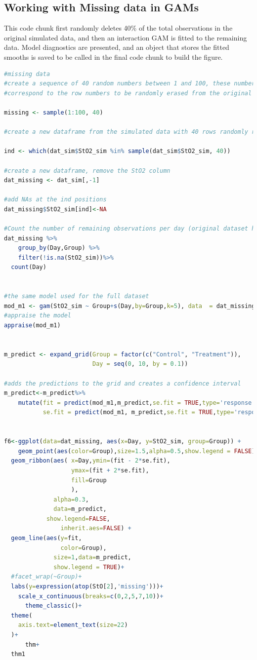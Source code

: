 \documentclass[
]{article}
\begin{document}
\hypertarget{working-with-missing-data-in-gams}{%
\subsection{Working with Missing data in GAMs}\label{working-with-missing-data-in-gams}}

This code chunk first randomly deletes 40\% of the total observations in the original simulated data, and then an interaction GAM is fitted to the remaining data. Model diagnostics are presented, and an object that stores the fitted smooths is saved to be called in the final code chunk to build the figure.

\begin{lstlisting}[language=R]
#missing data
#create a sequence of 40 random numbers between 1 and 100, these numbers will
#correspond to the row numbers to be randomly erased from the original dataset

missing <- sample(1:100, 40)

#create a new dataframe from the simulated data with 40 rows randomly removed, keep the missing values as NA

ind <- which(dat_sim$StO2_sim %in% sample(dat_sim$StO2_sim, 40))

#create a new dataframe, remove the StO2 column
dat_missing <- dat_sim[,-1]

#add NAs at the ind positions
dat_missing$StO2_sim[ind]<-NA 

#Count the number of remaining observations per day (original dataset had 10 per group per day)
dat_missing %>%
    group_by(Day,Group) %>%
    filter(!is.na(StO2_sim))%>%
  count(Day)


#the same model used for the full dataset
mod_m1 <- gam(StO2_sim ~ Group+s(Day,by=Group,k=5), data  = dat_missing,family=scat)
#appraise the model
appraise(mod_m1)


m_predict <- expand_grid(Group = factor(c("Control", "Treatment")),
                         Day = seq(0, 10, by = 0.1))

#adds the predictions to the grid and creates a confidence interval
m_predict<-m_predict%>%
    mutate(fit = predict(mod_m1,m_predict,se.fit = TRUE,type='response')$fit,
           se.fit = predict(mod_m1, m_predict,se.fit = TRUE,type='response')$se.fit)


f6<-ggplot(data=dat_missing, aes(x=Day, y=StO2_sim, group=Group)) +
    geom_point(aes(color=Group),size=1.5,alpha=0.5,show.legend = FALSE)+
  geom_ribbon(aes( x=Day,ymin=(fit - 2*se.fit), 
                   ymax=(fit + 2*se.fit),
                   fill=Group
                   ),
              alpha=0.3,
              data=m_predict,
            show.legend=FALSE,
                inherit.aes=FALSE) +
  geom_line(aes(y=fit,
                color=Group),
              size=1,data=m_predict,
              show.legend = TRUE)+
  #facet_wrap(~Group)+
  labs(y=expression(atop(StO[2],'missing')))+
    scale_x_continuous(breaks=c(0,2,5,7,10))+
      theme_classic()+
  theme(
    axis.text=element_text(size=22)
  )+
      thm+
  thm1
\end{lstlisting}
\end{document}
